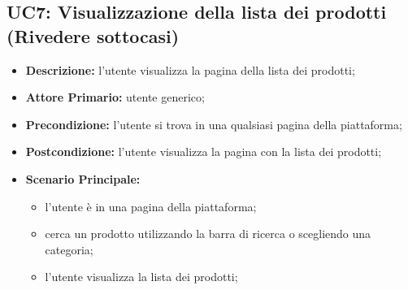 \subsection{UC7: Visualizzazione della lista dei prodotti (\textbf{Rivedere sottocasi})}
\label{sec:UC7}
\begin{itemize}
    \item \textbf{Descrizione:} l'utente visualizza la pagina della lista dei prodotti;
    \item \textbf{Attore Primario:} utente generico;
    \item \textbf{Precondizione:} l'utente si trova in una qualsiasi pagina della piattaforma;
    \item \textbf{Postcondizione:} l'utente visualizza la pagina con la lista dei prodotti;
    \item \textbf{Scenario Principale:}
          \begin{itemize}
              \item l'utente è in una pagina della piattaforma;
              \item cerca un prodotto utilizzando la barra di ricerca o scegliendo una categoria;
              \item l'utente visualizza la lista dei prodotti;
          \end{itemize}
\end{itemize}
